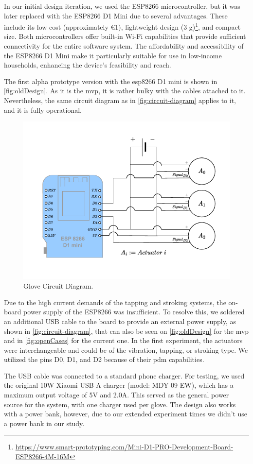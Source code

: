 In our initial design iteration, we used the ESP8266 microcontroller, but it was later replaced with the ESP8266 D1 Mini due to several advantages. These include its low cost (approximately €1), lightweight design (3 g)\footnote{\url{https://www.smart-prototyping.com/Mini-D1-PRO-Development-Board-ESP8266-4M-16M}}, and compact size. Both microcontrollers offer built-in Wi-Fi capabilities that provide sufficient connectivity for the entire software system. The affordability and accessibility of the ESP8266 D1 Mini make it particularly suitable for use in low-income households, enhancing the device's feasibility and reach.

The first alpha prototype version with the esp8266 D1 mini is shown in \autoref{fig:oldDesign}. As it is the \gls{mvp}, it is rather bulky with the cables attached to it. Nevertheless, the same circuit diagram as in \autoref{fig:circuit-diagram} applies to it, and it is fully operational.


\begin{figure}
    \centering
    \includegraphics[width=0.5\linewidth]{src/pictures/CircuitDiagramGlove.drawio.pdf}
    \caption{Glove Circuit Diagram.}
    \label{fig:circuit-diagram}
\end{figure}


Due to the high current demands of the tapping and stroking systems, the on-board power supply of the ESP8266 was insufficient. To resolve this, we soldered an additional USB cable to the board to provide an external power supply, as shown in \autoref{fig:circuit-diagram}, that can also be seen on \autoref{fig:oldDesign} for the \gls{mvp} and in \autoref{fig:openCases} for the current one.
In the first experiment, the actuators were interchangeable and could be of the vibration, tapping, or stroking type.
We utilized the pins D0, D1, and D2 because of their \gls{pdm} capabilities.

The USB cable was connected to a standard phone charger. For testing, we used the original 10W Xiaomi USB-A charger (model: MDY-09-EW), which has a maximum output voltage of 5V and 2.0A. This served as the general power source for the system, with one charger used per glove. The design also works with a power bank, however, due to our extended experiment times we didn't use a power bank in our study.

